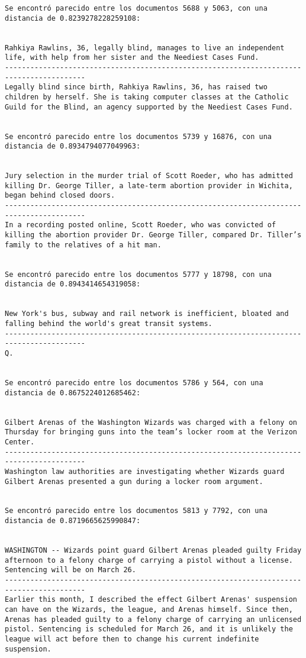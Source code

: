 \documentclass[11pt]{article}
\begin{document}
\begin{Verbatim}[commandchars=\\\{\}]
Se encontró parecido entre los documentos 5688 y 5063, con una distancia de 0.8239278228259108:


Rahkiya Rawlins, 36, legally blind, manages to live an independent life, with help from her sister and the Neediest Cases Fund.
-----------------------------------------------------------------------------------------
Legally blind since birth, Rahkiya Rawlins, 36, has raised two children by herself. She is taking computer classes at the Catholic Guild for the Blind, an agency supported by the Neediest Cases Fund.


Se encontró parecido entre los documentos 5739 y 16876, con una distancia de 0.8934794077049963:


Jury selection in the murder trial of Scott Roeder, who has admitted killing Dr. George Tiller, a late-term abortion provider in Wichita, began behind closed doors.
-----------------------------------------------------------------------------------------
In a recording posted online, Scott Roeder, who was convicted of killing the abortion provider Dr. George Tiller, compared Dr. Tiller’s family to the relatives of a hit man.


Se encontró parecido entre los documentos 5777 y 18798, con una distancia de 0.8943414654319058:


New York's bus, subway and rail network is inefficient, bloated and falling behind the world's great transit systems.
-----------------------------------------------------------------------------------------
Q.


Se encontró parecido entre los documentos 5786 y 564, con una distancia de 0.8675224012685462:


Gilbert Arenas of the Washington Wizards was charged with a felony on Thursday for bringing guns into the team’s locker room at the Verizon Center.
-----------------------------------------------------------------------------------------
Washington law authorities are investigating whether Wizards guard Gilbert Arenas presented a gun during a locker room argument.


Se encontró parecido entre los documentos 5813 y 7792, con una distancia de 0.8719665625990847:


WASHINGTON -- Wizards point guard Gilbert Arenas pleaded guilty Friday afternoon to a felony charge of carrying a pistol without a license. Sentencing will be on March 26.
-----------------------------------------------------------------------------------------
Earlier this month, I described the effect Gilbert Arenas' suspension can have on the Wizards, the league, and Arenas himself. Since then, Arenas has pleaded guilty to a felony charge of carrying an unlicensed pistol. Sentencing is scheduled for March 26, and it is unlikely the league will act before then to change his current indefinite suspension.



\end{Verbatim}
\end{document}
